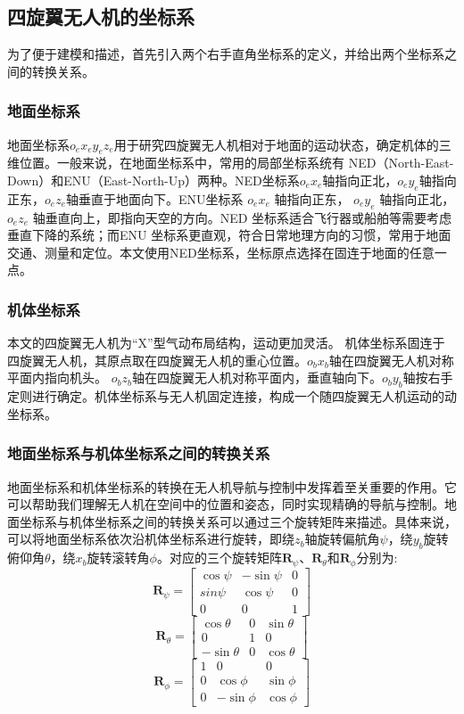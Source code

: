 \documentclass[lang=chs, degree=master, blindreview=true, winfonts=true]{yanputhesis}
\begin{document}
\subsection{四旋翼无人机的坐标系}
为了便于建模和描述，首先引入两个右手直角坐标系的定义，并给出两个坐标系之间的转换关系。
\subsubsection{地面坐标系}
地面坐标系$o_ex_ey_ez_e$用于研究四旋翼无人机相对于地面的运动状态，确定机体的三维位置。一般来说，在地面坐标系中，常用的局部坐标系统有 NED（North-East-Down）和ENU（East-North-Up）两种。NED坐标系$o_ex_e$轴指向正北，$o_ey_e$轴指向正东，$o_ez_e$轴垂直于地面向下。ENU坐标系 $o_ex_e$ 轴指向正东，
$o_ey_e$ 轴指向正北，$o_ez_e$ 轴垂直向上，即指向天空的方向。NED 坐标系适合飞行器或船舶等需要考虑垂直下降的系统；而ENU 坐标系更直观，符合日常地理方向的习惯，常用于地面交通、测量和定位。本文使用NED坐标系，坐标原点选择在固连于地面的任意一点。

\subsubsection{机体坐标系}
本文的四旋翼无人机为“X”型气动布局结构，运动更加灵活。
机体坐标系固连于四旋翼无人机，其原点取在四旋翼无人机的重心位置。$o_bx_b$轴在四旋翼无人机对称平面内指向机头。 $o_bz_b$轴在四旋翼无人机对称平面内，垂直轴向下。$o_by_b$轴按右手定则进行确定。机体坐标系与无人机固定连接，构成一个随四旋翼无人机运动的动坐标系。
\subsubsection{地面坐标系与机体坐标系之间的转换关系}
地面坐标系和机体坐标系的转换在无人机导航与控制中发挥着至关重要的作用。它可以帮助我们理解无人机在空间中的位置和姿态，同时实现精确的导航与控制。地面坐标系与机体坐标系之间的转换关系可以通过三个旋转矩阵来描述。具体来说，可以将地面坐标系依次沿机体坐标系进行旋转，即绕$z_b$轴旋转偏航角$\psi$，绕$y_b$旋转俯仰角$\theta$，绕$x_b$旋转滚转角$\phi$。对应的三个旋转矩阵$\boldsymbol{R}_\psi$、$\boldsymbol{R}_\theta$和$\boldsymbol{R}_\phi$分别为:
$$
\boldsymbol{R}_\psi=\begin{bmatrix}\cos\psi&-\sin\psi&0\\sin\psi&\cos\psi&0\\0&0&1\end{bmatrix} $$
$$	\boldsymbol{R}_\theta=\begin{bmatrix}\cos\theta&0&\sin\theta\\0&1&0\\-\sin\theta&0&\cos\theta\end{bmatrix} $$
$$\boldsymbol{R}_\phi=\begin{bmatrix}1&0&0\\0&\cos\phi&\sin\phi\\0&-\sin\phi&\cos\phi\end{bmatrix}
$$
\end{document}
